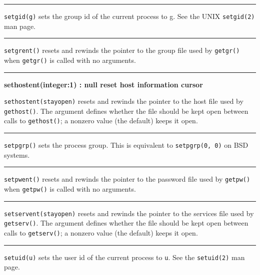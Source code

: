 \bigskip\hrule\vspace{0.1cm}

\noindent
\texttt{setgid(g)} sets the group id of the current process to g. See the UNIX
\texttt{setgid(2)} man page. 

\bigskip\hrule\vspace{0.1cm}

\noindent
\texttt{setgrent()} resets and rewinds the pointer to the group file used by
\texttt{getgr()} when \texttt{getgr()} is called with no arguments. 

\bigskip\hrule\vspace{0.1cm}
\noindent
{\bf sethostent(integer:1) : null \hfill reset host information cursor}

\noindent
\texttt{sethostent(stayopen)} resets and rewinds the pointer to the host file
used by \texttt{gethost()}. The argument defines whether the file should be kept
open between calls to \texttt{gethost()}; a nonzero value (the default) keeps it
open. 

\bigskip\hrule\vspace{0.1cm}

\noindent
\texttt{setpgrp()} sets the process group. This is equivalent to
\texttt{setpgrp(0, 0)} on BSD systems. 

\bigskip\hrule\vspace{0.1cm}

\noindent
\texttt{setpwent()} resets and rewinds the pointer to the password file used by
\texttt{getpw()} when \texttt{getpw()} is called with no arguments.

\bigskip\hrule\vspace{0.1cm}

\noindent
\texttt{setservent(stayopen)} resets and rewinds the pointer to the
services file used by \texttt{getserv()}. The argument defines whether
the file should be kept open between calls to \texttt{getserv()}; a
nonzero value (the default) keeps it open. 

\bigskip\hrule\vspace{0.1cm}

\noindent
\texttt{setuid(u)} sets the user id of the current process to
\texttt{u}. See the \texttt{setuid(2)} man page. 

